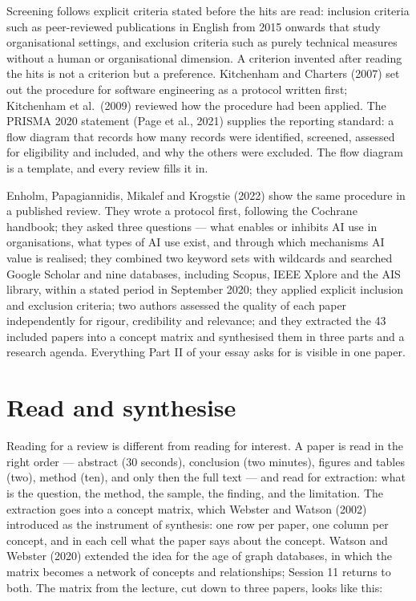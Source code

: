 \documentclass[11pt,a4paper,british,twoside=false,headings=small,chapterprefix=false,numbers=noenddot]{scrbook}
\begin{document}
Screening follows explicit criteria stated before the hits are read: inclusion criteria such as peer-reviewed publications in English from 2015 onwards that study organisational settings, and exclusion criteria such as purely technical measures without a human or organisational dimension. A criterion invented after reading the hits is not a criterion but a preference. Kitchenham and Charters (2007) set out the procedure for software engineering as a protocol written first; Kitchenham et al.\ (2009) reviewed how the procedure had been applied. The PRISMA 2020 statement (Page et al., 2021) supplies the reporting standard: a flow diagram that records how many records were identified, screened, assessed for eligibility and included, and why the others were excluded. The flow diagram is a template, and every review fills it in.



Enholm, Papagiannidis, Mikalef and Krogstie (2022) show the same procedure in a published review. They wrote a protocol first, following the Cochrane handbook; they asked three questions --- what enables or inhibits AI use in organisations, what types of AI use exist, and through which mechanisms AI value is realised; they combined two keyword sets with wildcards and searched Google Scholar and nine databases, including Scopus, IEEE Xplore and the AIS library, within a stated period in September 2020; they applied explicit inclusion and exclusion criteria; two authors assessed the quality of each paper independently for rigour, credibility and relevance; and they extracted the 43 included papers into a concept matrix and synthesised them in three parts and a research agenda. Everything Part II of your essay asks for is visible in one paper.

\section{Read and synthesise}

Reading for a review is different from reading for interest. A paper is read in the right order --- abstract (30 seconds), conclusion (two minutes), figures and tables (two), method (ten), and only then the full text --- and read for extraction: what is the question, the method, the sample, the finding, and the limitation. The extraction goes into a concept matrix, which Webster and Watson (2002) introduced as the instrument of synthesis: one row per paper, one column per concept, and in each cell what the paper says about the concept. Watson and Webster (2020) extended the idea for the age of graph databases, in which the matrix becomes a network of concepts and relationships; Session 11 returns to both. The matrix from the lecture, cut down to three papers, looks like this:
\end{document}
